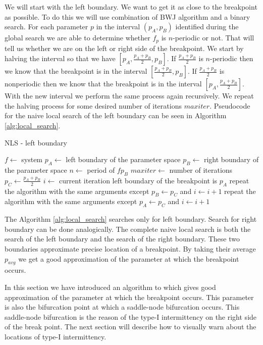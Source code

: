 \par
We will start with the left boundary. We want to get it as close to the breakpoint as possible.
To do this we will use combination of BWJ algorithm and a binary search.
For each parameter $p$ in the interval $(p_{A}, p_{B})$ identified during the global search we are able to determine whether $f_{p}$ is $n$-periodic or not.
That will tell us whether we are on the left or right side of the breakpoint.
We start by halving the interval so that we have $[p_{A}, \frac{p_{A}+p_{B}}{2}, p_{B}]$.
If $\frac{p_{A}+p_{B}}{2}$ is $n$-periodic then we know that the breakpoint is in the interval $[\frac{p_{A}+p_{B}}{2}, p_{B}]$.
If $\frac{p_{A}+p_{B}}{2}$ is nonperiodic then we know that the breakpoint is in the interval $[p_{A}, \frac{p_{A}+p_{B}}{2}]$.
With the new interval we perform the same process again recursively.
We repeat the halving process for some desired number of iterations $maxiter$.
Pseudocode for the naive local search of the left boundary can be seen in Algorithm \ref{alg:local_search}.

\begin{algorithm}[!h]
    \caption{NLS - left boundary}
    \label{alg:local_search}
    \begin{algorithmic}[1]
        \Statex $f \gets$ system
        \Statex $p_{A} \gets$ left boundary of the parameter space
        \Statex $p_{B} \gets$ right boundary of the parameter space
        \Statex $n \gets$ period of $f{p_{B}}$
        \Statex $maxiter \gets$ number of iterations
        \State $p_{C} \gets \frac{p_{A}+p_{B}}{2}$
        \State $i \gets$ current iteration
            \State left boundary of the breakpoint is $p_{A}$
        \EndIf
            \State repeat the algorithm with the same arguments except $p_{B} \gets p_{C}$ and $i \gets i+1$
        \Else
            \State repeat the algorithm with the same arguments except $p_{A} \gets p_{C}$ and $i \gets i+1$
        \EndIf
    \end{algorithmic}
\end{algorithm}

\par
The Algorithm \ref{alg:local_search} searches only for left boundary. Search for right boundary can be done analogically.
The complete naive local search is both the search of the left boundary and the search of the right boundary.
These two boundaries approximate precise location of a breakpoint.
By taking their average $p_{avg}$ we get a good approximation of the parameter at which the breakpoint occurs.
\par
In this section we have introduced an algorithm to which gives good approximation of the parameter at which the breakpoint occurs.
This parameter is also the bifurcation point at which a saddle-node bifurcation occurs.
This saddle-node bifurcation is the reason of the type-I intermittency on the right side of the break point.
The next section will describe how to visually warn about the locations of type-I intermittency.

